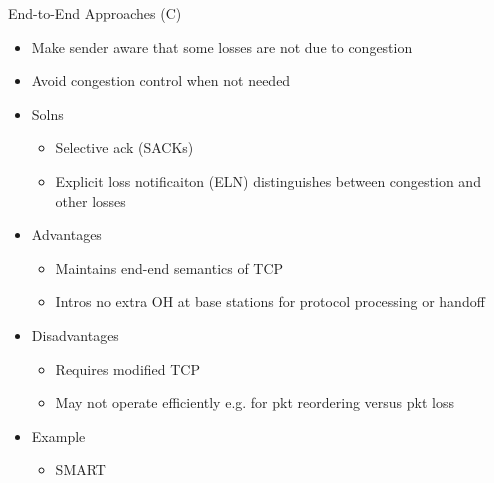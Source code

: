 End-to-End Approaches (C)
\begin{itemize}
	\item Make sender aware that some losses are not due to congestion
	\item Avoid congestion control when not needed
	\item Solns
	\begin{itemize}
		\item Selective ack (SACKs)
		\item Explicit loss notificaiton (ELN) distinguishes between
			congestion and other losses
	\end{itemize}
	\item Advantages
	\begin{itemize}
		\item Maintains end-end semantics of TCP
		\item Intros no extra OH at base stations for protocol
			processing or handoff
	\end{itemize}
	\item Disadvantages
	\begin{itemize}
		\item Requires modified TCP
		\item May not operate efficiently e.g. for pkt reordering versus
			pkt loss
	\end{itemize}
	\item Example
	\begin{itemize}
		\item SMART
	\end{itemize}
\end{itemize}
